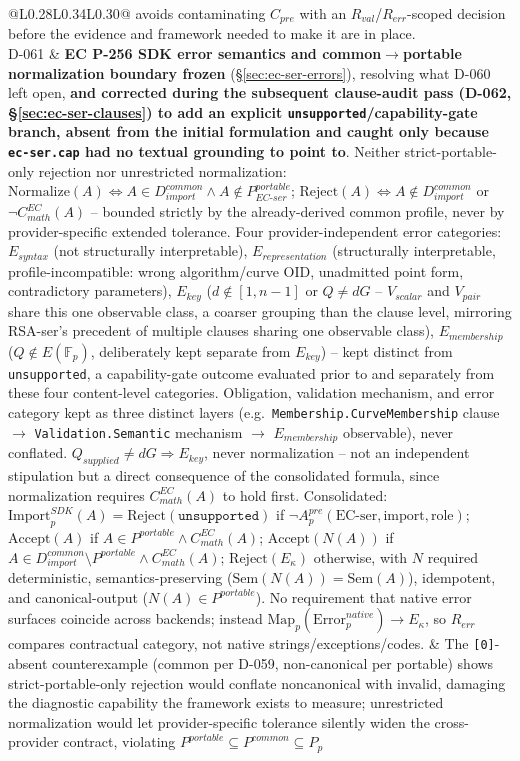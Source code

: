 \documentclass[11pt,a4paper]{article}
\begin{document}
\begin{longtable}{@{}L{0.28\textwidth}L{0.34\textwidth}L{0.30\textwidth}@{}}
avoids contaminating $C_{pre}$ with an $R_{val}$/$R_{err}$-scoped decision before the evidence and framework needed to make it are in place.\\
D-061 & \textbf{EC P-256 SDK error semantics and common$\to$portable normalization boundary frozen} (\S\ref{sec:ec-ser-errors}), resolving what D-060 left open, \textbf{and corrected during the subsequent clause-audit pass (D-062, \S\ref{sec:ec-ser-clauses}) to add an explicit \texttt{unsupported}/capability-gate branch, absent from the initial formulation and caught only because \texttt{ec-ser.cap} had no textual grounding to point to}. Neither strict-portable-only rejection nor unrestricted normalization: $\text{Normalize}(A) \iff A\in D_{import}^{common} \wedge A\notin P_{EC\text{-}ser}^{portable}$; $\text{Reject}(A) \iff A\notin D_{import}^{common}$ or $\neg C_{math}^{EC}(A)$ -- bounded strictly by the already-derived common profile, never by provider-specific extended tolerance. Four provider-independent error categories: $E_{syntax}$ (not structurally interpretable), $E_{representation}$ (structurally interpretable, profile-incompatible: wrong algorithm/curve OID, unadmitted point form, contradictory parameters), $E_{key}$ ($d\notin[1,n-1]$ or $Q\neq dG$ -- $V_{scalar}$ and $V_{pair}$ share this one observable class, a coarser grouping than the clause level, mirroring RSA-ser's precedent of multiple clauses sharing one observable class), $E_{membership}$ ($Q\notin E(\mathbb{F}_p)$, deliberately kept separate from $E_{key}$) -- kept distinct from \texttt{unsupported}, a capability-gate outcome evaluated prior to and separately from these four content-level categories. Obligation, validation mechanism, and error category kept as three distinct layers (e.g.\ \texttt{Membership.CurveMembership} clause $\to$ \texttt{Validation.Semantic} mechanism $\to$ $E_{membership}$ observable), never conflated. $Q_{supplied}\neq dG \Rightarrow E_{key}$, never normalization -- not an independent stipulation but a direct consequence of the consolidated formula, since normalization requires $C_{math}^{EC}(A)$ to hold first. Consolidated: $\text{Import}_p^{SDK}(A) = \text{Reject}(\texttt{unsupported})$ if $\neg A_p^{pre}(\text{EC-ser},\text{import},\text{role})$; $\text{Accept}(A)$ if $A\in P^{portable}\wedge C_{math}^{EC}(A)$; $\text{Accept}(N(A))$ if $A\in D_{import}^{common}\setminus P^{portable}\wedge C_{math}^{EC}(A)$; $\text{Reject}(E_\kappa)$ otherwise, with $N$ required deterministic, semantics-preserving ($\text{Sem}(N(A))=\text{Sem}(A)$), idempotent, and canonical-output ($N(A)\in P^{portable}$). No requirement that native error surfaces coincide across backends; instead $\text{Map}_p(\text{Error}_p^{native})\to E_\kappa$, so $R_{err}$ compares contractual category, not native strings/exceptions/codes. & The \texttt{[0]}-absent counterexample (common per D-059, non-canonical per portable) shows strict-portable-only rejection would conflate noncanonical with invalid, damaging the diagnostic capability the framework exists to measure; unrestricted normalization would let provider-specific tolerance silently widen the cross-provider contract, violating $P^{portable}\subseteq P^{common}\subseteq P_p$ 
\end{longtable}
\end{document}
